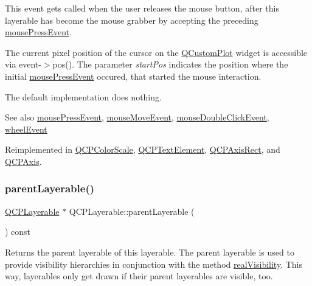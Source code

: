 This event gets called when the user releases the mouse button, after this layerable has become the mouse grabber by accepting the preceding \hyperlink{classQCPLayerable_af6567604818db90f4fd52822f8bc8376}{mouse\+Press\+Event}.

The current pixel position of the cursor on the \hyperlink{classQCustomPlot}{Q\+Custom\+Plot} widget is accessible via {\ttfamily event-\/$>$pos()}. The parameter {\itshape start\+Pos} indicates the position where the initial \hyperlink{classQCPLayerable_af6567604818db90f4fd52822f8bc8376}{mouse\+Press\+Event} occured, that started the mouse interaction.

The default implementation does nothing.

\begin{DoxySeeAlso}{See also}
\hyperlink{classQCPLayerable_af6567604818db90f4fd52822f8bc8376}{mouse\+Press\+Event}, \hyperlink{classQCPLayerable_a9eee1ba47fd69be111059ca3881933e4}{mouse\+Move\+Event}, \hyperlink{classQCPLayerable_a4171e2e823aca242dd0279f00ed2de81}{mouse\+Double\+Click\+Event}, \hyperlink{classQCPLayerable_a47dfd7b8fd99c08ca54e09c362b6f022}{wheel\+Event} 
\end{DoxySeeAlso}


Reimplemented in \hyperlink{classQCPColorScale_a6a35dd39ab4e5cb2d7b29ebb4d5b61b0}{Q\+C\+P\+Color\+Scale}, \hyperlink{classQCPTextElement_acfcbaf9b1da18745e72726aafb39c855}{Q\+C\+P\+Text\+Element}, \hyperlink{classQCPAxisRect_a6c89b988d3a0b93c0878f0ebdb5037f4}{Q\+C\+P\+Axis\+Rect}, and \hyperlink{classQCPAxis_a780bee321fc6476e5fc49c4980291a01}{Q\+C\+P\+Axis}.

\mbox{\label{classQCPLayerable_aa78b7e644d2c519e1a9a6f2ac5fcd858}} 
\subsubsection{\texorpdfstring{parent\+Layerable()}{parentLayerable()}}
{\footnotesize\ttfamily \hyperlink{classQCPLayerable}{Q\+C\+P\+Layerable} $\ast$ Q\+C\+P\+Layerable\+::parent\+Layerable (\begin{DoxyParamCaption}{ }\end{DoxyParamCaption}) const\hspace{0.3cm}{\ttfamily [inline]}}

Returns the parent layerable of this layerable. The parent layerable is used to provide visibility hierarchies in conjunction with the method \hyperlink{classQCPLayerable_ab054e88f15d485defcb95e7376f119e7}{real\+Visibility}. This way, layerables only get drawn if their parent layerables are visible, too.


